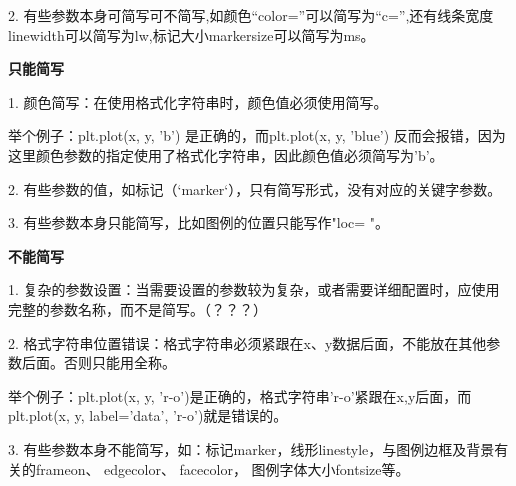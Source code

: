 \documentclass[12pt]{article}
\begin{document}
2. 有些参数本身可简写可不简写,如颜色“color=”可以简写为“c=”,还有线条宽度linewidth可以简写为lw,标记大小markersize可以简写为ms。

\noindent\textbf{\large 只能简写}

1. 颜色简写：在使用格式化字符串时，颜色值必须使用简写。

举个例子：plt.plot(x, y, 'b') 是正确的，而plt.plot(x, y, 'blue') 反而会报错，因为这里颜色参数的指定使用了格式化字符串，因此颜色值必须简写为'b'。

2. 有些参数的值，如标记（`marker`），只有简写形式，没有对应的关键字参数。

3. 有些参数本身只能简写，比如图例的位置只能写作"loc= "。

\noindent\textbf{\large 不能简写}

1.  复杂的参数设置：当需要设置的参数较为复杂，或者需要详细配置时，应使用完整的参数名称，而不是简写。（？？？）

2. 格式字符串位置错误：格式字符串必须紧跟在x、y数据后面，不能放在其他参数后面。否则只能用全称。

举个例子：plt.plot(x, y, 'r-o')是正确的，格式字符串'r-o'紧跟在x,y后面，而plt.plot(x, y, label='data', 'r-o')就是错误的。

3. 有些参数本身不能简写，如：标记marker，线形linestyle，与图例边框及背景有关的frameon、 edgecolor、 facecolor， 图例字体大小fontsize等。
\end{document}
